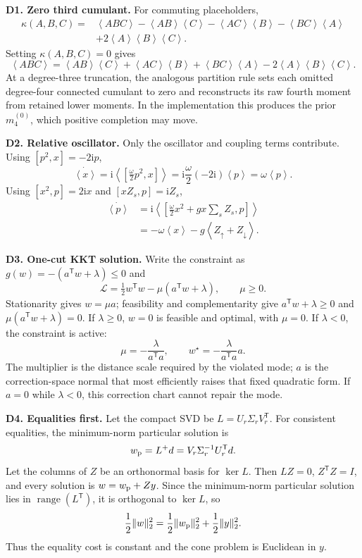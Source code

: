 \documentclass[10pt,letterpaper,twocolumn]{article}
\newcommand{\ii}{\mathrm i}
\newcommand{\expect}[1]{\left\langle #1\right\rangle}
\newcommand{\sectionline}[1]{%
  \Needspace{6\baselineskip}%
  \par\medskip{\color{navy}\large\bfseries #1}\par
  \vspace{-2pt}{\color{navy}\rule{\columnwidth}{0.7pt}}\par\smallskip
}
\begin{document}
\sectionline{Part III --- Derivations}

\textbf{D1. Zero third cumulant.}
For commuting placeholders,
\[
\begin{aligned}
\kappa(A,B,C)={}&\expect{ABC}
-\expect{AB}\expect C-\expect{AC}\expect B
-\expect{BC}\expect A\\
&+2\expect A\expect B\expect C.
\end{aligned}
\]
Setting \(\kappa(A,B,C)=0\) gives
\[
\expect{ABC}=\expect{AB}\expect C+\expect{AC}\expect B
+\expect{BC}\expect A-2\expect A\expect B\expect C.
\]
At a degree-three truncation, the analogous partition rule sets each omitted
degree-four connected cumulant to zero and reconstructs its raw fourth moment
from retained lower moments.  In the implementation this produces the prior
\(m_4^{(0)}\), which positive completion may move.

\textbf{D2. Relative oscillator.}
Only the oscillator and coupling terms contribute.  Using
\([p^2,x]=-2\ii p\),
\[
\dot{\expect x}
=\ii\expect{[\tfrac\omega2p^2,x]}
=\ii\frac\omega2(-2\ii)\expect p
=\omega\expect p.
\]
Using \([x^2,p]=2\ii x\) and \([xZ_s,p]=\ii Z_s\),
\[
\begin{aligned}
\dot{\expect p}
&=\ii\expect{[\tfrac\omega2x^2+gx\sum_sZ_s,p]}\\
&=-\omega\expect x-g\expect{Z_\uparrow+Z_\downarrow}.
\end{aligned}
\]

\textbf{D3. One-cut KKT solution.}
Write the constraint as \(g(w)=-(a^{\mathsf T}w+\lambda)\le0\) and
\[
\mathcal L=\tfrac12w^{\mathsf T}w-\mu(a^{\mathsf T}w+\lambda),
\qquad \mu\ge0.
\]
Stationarity gives \(w=\mu a\); feasibility and complementarity give
\(a^{\mathsf T}w+\lambda\ge0\) and
\(\mu(a^{\mathsf T}w+\lambda)=0\).  If \(\lambda\ge0\), \(w=0\) is feasible
and optimal, with \(\mu=0\).  If \(\lambda<0\), the constraint is active:
\[
\mu=-\frac{\lambda}{a^{\mathsf T}a},\qquad
w^\star=-\frac{\lambda}{a^{\mathsf T}a}a.
\]
The multiplier is the distance scale required by the violated mode; \(a\) is
the correction-space normal that most efficiently raises that fixed quadratic
form.  If \(a=0\) while \(\lambda<0\), this correction chart cannot repair the
mode.

\textbf{D4. Equalities first.}
Let the compact SVD be \(L=U_r\Sigma_rV_r^{\mathsf T}\).  For consistent
equalities, the minimum-norm particular solution is
\[
w_{\rm p}=L^+d=V_r\Sigma_r^{-1}U_r^{\mathsf T}d.
\]
Let the columns of \(Z\) be an orthonormal basis for \(\ker L\).  Then
\(LZ=0\), \(Z^{\mathsf T}Z=I\), and every solution is
\(w=w_{\rm p}+Zy\).  Since the minimum-norm particular solution lies in
\(\operatorname{range}(L^{\mathsf T})\), it is orthogonal to \(\ker L\), so
\[
\frac12\|w\|_2^2
=\frac12\|w_{\rm p}\|_2^2+\frac12\|y\|_2^2.
\]
Thus the equality cost is constant and the cone problem is Euclidean in \(y\).
\end{document}
